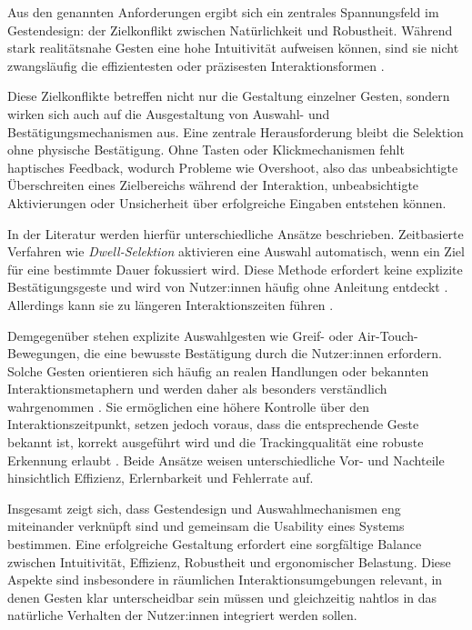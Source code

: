 Aus den genannten Anforderungen ergibt sich ein zentrales Spannungsfeld im Gestendesign: der Zielkonflikt zwischen Natürlichkeit und Robustheit. Während stark realitätsnahe Gesten eine hohe Intuitivität aufweisen können, sind sie nicht zwangsläufig die effizientesten oder präzisesten Interaktionsformen \parencite{jacob2008realitybasedinteraction}.

Diese Zielkonflikte betreffen nicht nur die Gestaltung einzelner Gesten, sondern wirken sich auch auf die Ausgestaltung von Auswahl- und Bestätigungsmechanismen aus.
Eine zentrale Herausforderung bleibt die Selektion ohne physische Bestäti\-gung. Ohne Tasten oder Klickmechanismen fehlt haptisches Feedback, wodurch Probleme wie Overshoot, also das unbeabsichtigte Überschreiten eines Zielbereichs während der Interaktion, unbeabsichtigte Aktivierungen oder Unsicherheit über erfolgreiche Eingaben entstehen können.

In der Literatur werden hierfür unterschiedliche Ansätze beschrieben. Zeitbasierte Verfahren wie \textit{Dwell-Selektion} aktivieren eine Auswahl automatisch, wenn ein Ziel für eine bestimmte Dauer fokussiert wird. Diese Methode erfordert keine explizite Bestätigungsgeste und wird von Nutzer:innen häufig ohne Anleitung entdeckt \parencite{walterBaillyValkanova2014CuenesicsUsingMidAirGesturesToSelectItemsOnInteractivePublicDisplays}. Allerdings kann sie zu längeren Interaktionszeiten führen \parencite{dube2022pushtabdwellpinchevaluationofselectionmethods}.

Demgegenüber stehen explizite Auswahlgesten wie Greif- oder Air-Touch-Bewegungen, die eine bewusste Bestätigung durch die Nutzer:innen erfordern. Solche Gesten orientieren sich häufig an realen Handlungen oder bekannten Interaktionsmetaphern und werden daher als besonders verständlich wahrgenommen \parencite{kostic2024exploringmidairhandinteractionindatavisualization}. Sie ermög\-lichen eine höhere Kontrolle über den Interaktionszeitpunkt, setzen jedoch voraus, dass die entsprechende Geste bekannt ist, korrekt ausgeführt wird und die Trackingqualität eine robuste Erkennung erlaubt \parencite{dube2022pushtabdwellpinchevaluationofselectionmethods}.
Beide Ansätze weisen unterschiedliche Vor- und Nachteile hinsichtlich Effizienz, Erlernbarkeit und Fehlerrate auf.

Insgesamt zeigt sich, dass Gestendesign und Auswahlmechanismen eng miteinander verknüpft sind und gemeinsam die Usability eines Systems bestimmen. Eine erfolgreiche Gestaltung erfordert eine sorgfältige Balance zwischen Intuitivität, Effizienz, Robustheit und ergonomischer Belastung. Diese Aspekte sind insbesondere in räumlichen Interaktionsumgebungen relevant, in denen Gesten klar unterscheidbar sein müssen und gleichzeitig nahtlos in das natürliche Verhalten der Nutzer:innen integriert werden sollen.


